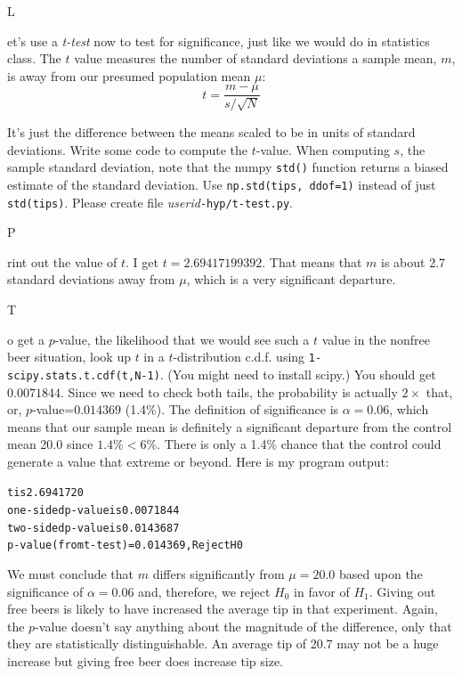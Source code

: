 \documentclass[titlepage]{tufte-book}
\newcounter{problem}
\newcommand{\step}[1]{{}
\vspace{4pt} \noindent {\bf \theproblem. }#1\addtocounter{problem}{1}}
\begin{document}
\begin{fullwidth}
\setcounter{problem}{1}

\step Let's use a {\em t-test} now to test for significance, just like we would do in statistics class. The $t$ value measures the number of standard deviations a sample mean, $m$, is away from our presumed population mean $\mu$: \\

\[\tag{t-value}
t = \frac{m - \mu}{s / \sqrt{N}}
\]

\noindent It's just the difference between the means scaled to be in units of standard deviations.  Write some code to compute the $t$-value. When computing $s$, the sample standard deviation, note that the numpy {\tt std()} function returns a biased estimate of the standard deviation. Use {\tt np.std(tips, ddof=1)} instead of just {\tt std(tips)}.  Please create file {\em userid}{\tt -hyp/t-test.py}.

\step Print out the value of $t$.  I get $t = 2.69417199392$. That means that $m$ is about 2.7 standard deviations away from $\mu$, which is a very significant departure. 

\step  To get a $p$-value, the likelihood that we would see such a $t$ value in the nonfree beer situation, look up $t$ in a $t$-distribution c.d.f. using {\tt 1-scipy.stats.t.cdf(t,N-1)}. (You might need to install scipy.) You should get $0.0071844$. Since we need to check both tails, the probability is actually $2 \times$ that, or, $p$-value=$0.014369$ (1.4\%). The definition of significance is $\alpha = 0.06$, which means that our sample mean is definitely a significant departure from the control mean 20.0 since $1.4\% < 6\%$.  There is only a 1.4\% chance that the control could generate a value that extreme or beyond. Here is my program output:

\begin{alltt}
t is 2.6941720
one-sided p-value is 0.0071844
two-sided p-value is 0.0143687
p-value (from t-test) = 0.014369, Reject H0
\end{alltt}

We must conclude that $m$ differs significantly from $\mu = 20.0$ based upon the significance of $\alpha=0.06$ and, therefore, we reject $H_0$ in favor of $H_1$.  Giving out free beers is likely to have increased the average tip in that experiment. Again, the $p$-value doesn't say anything about the magnitude of the difference, only that they are statistically distinguishable. An average tip of 20.7 may not be a huge increase but giving free beer does increase tip size.


\end{fullwidth}
\end{document}
